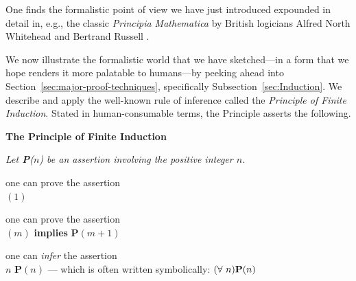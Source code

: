 \bigskip

 
\noindent
One finds the formalistic point of view we have just introduced expounded in detail in, e.g., the classic {\it Principia Mathematica} by British logicians Alfred North Whitehead and Bertrand Russell \cite{Russell03}.

\smallskip

We now illustrate the formalistic world that we have sketched---in a form that we hope renders it more palatable to humans---by peeking ahead into Section~\ref{sec:major-proof-techniques}, specifically Subsection~\ref{sec:Induction}.  We describe and apply the well-known rule of inference called the {\it Principle of Finite Induction}.  Stated in human-consumable terms, the Principle asserts the following.

\bigskip

 

\noindent 
\hspace*{.1in}\begin{minipage}{0.95\textwidth}
{\bf The Principle of Finite Induction}

{\em
Let {\bf P}($n$) be an assertion involving the positive integer $n$.

\hspace*{.15in}{\bf if} one can prove the assertion \\
\hspace*{.35in}{\bf P}$(1)$

\hspace*{.15in}{\bf and} one can prove the assertion \\
\hspace*{.35in}{\bf P}$(m)$ {\bf implies} {\bf P}$(m+1)$

\hspace*{.15in}{\bf then} one can {\em infer} the assertion \\
\hspace*{.35in}{\bf for all} $n$ {\bf P}$(n)$
   \hspace*{.15in}--- which is often written symbolically:  $(\forall \ n) \mbox{\bf P}(n)$
}
\end{minipage} 

\bigskip

 

\medskip

